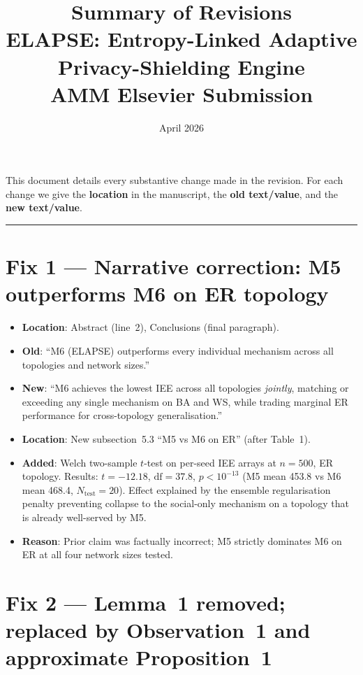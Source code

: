 \documentclass[11pt,a4paper]{article}
\title{\textbf{Summary of Revisions}\\
\large ELAPSE: Entropy-Linked Adaptive Privacy-Shielding Engine\\
AMM Elsevier Submission}
\author{}
\date{April 2026}
\begin{document}
\maketitle
\thispagestyle{empty}

This document details every substantive change made in the revision.
For each change we give the \textbf{location} in the manuscript,
the \textbf{old text/value}, and the \textbf{new text/value}.

\medskip
\noindent\rule{\linewidth}{0.4pt}

\section*{Fix 1 — Narrative correction: M5 outperforms M6 on ER topology}

\begin{itemize}
\item \textbf{Location}: Abstract (line~2), Conclusions (final paragraph).
\item \textbf{Old}: ``M6 (ELAPSE) outperforms every individual mechanism across all
  topologies and network sizes.''
\item \textbf{New}: ``M6 achieves the lowest IEE across all topologies \emph{jointly},
  matching or exceeding any single mechanism on BA and WS, while trading marginal
  ER performance for cross-topology generalisation.''
\item \textbf{Location}: New subsection~5.3 ``M5 vs M6 on ER'' (after Table~1).
\item \textbf{Added}: Welch two-sample $t$-test on per-seed IEE arrays at $n=500$,
  ER topology.  Results: $t = -12.18$, $\mathrm{df} = 37.8$, $p < 10^{-13}$
  (M5 mean 453.8 vs M6 mean 468.4, $N_{\mathrm{test}}=20$).  Effect explained by the ensemble
  regularisation penalty preventing collapse to the social-only mechanism
  on a topology that is already well-served by M5.
\item \textbf{Reason}: Prior claim was factually incorrect; M5 strictly dominates
  M6 on ER at all four network sizes tested.
\end{itemize}

\section*{Fix 2 — Lemma~1 removed; replaced by Observation~1 and approximate Proposition~1}
\end{document}

